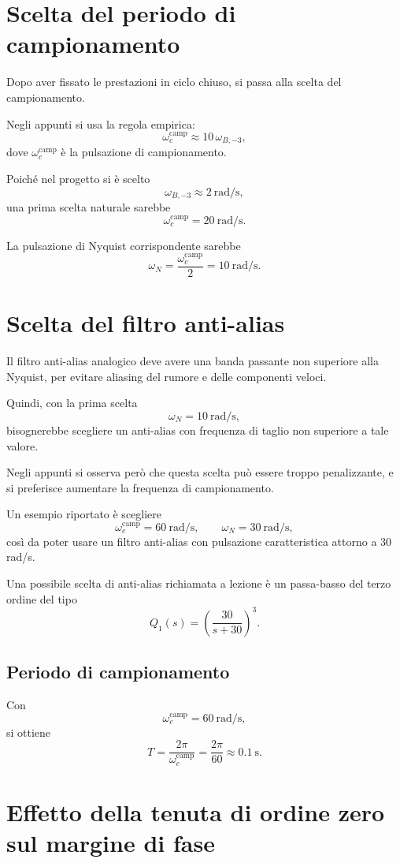 \section{Scelta del periodo di campionamento}

Dopo aver fissato le prestazioni in ciclo chiuso, si passa alla scelta del campionamento.

Negli appunti si usa la regola empirica:
\[
\omega_c^\text{camp} \approx 10\,\omega_{B,-3},
\]
dove \(\omega_c^\text{camp}\) \`e la pulsazione di campionamento.

Poich\'e nel progetto si \`e scelto
\[
\omega_{B,-3}\approx 2\ \text{rad/s},
\]
una prima scelta naturale sarebbe
\[
\omega_c^\text{camp}=20\ \text{rad/s}.
\]

La pulsazione di Nyquist corrispondente sarebbe
\[
\omega_N=\frac{\omega_c^\text{camp}}{2}=10\ \text{rad/s}.
\]

\section{Scelta del filtro anti-alias}

Il filtro anti-alias analogico deve avere una banda passante non superiore alla Nyquist,
per evitare aliasing del rumore e delle componenti veloci.

Quindi, con la prima scelta
\[
\omega_N=10\ \text{rad/s},
\]
bisognerebbe scegliere un anti-alias con frequenza di taglio non superiore a tale valore.

Negli appunti si osserva per\`o che questa scelta pu\`o essere troppo penalizzante,
e si preferisce aumentare la frequenza di campionamento.

Un esempio riportato \`e scegliere
\[
\omega_c^\text{camp}=60\ \text{rad/s},
\qquad
\omega_N=30\ \text{rad/s},
\]
cos\`i da poter usare un filtro anti-alias con pulsazione caratteristica attorno a \(30\) rad/s.

Una possibile scelta di anti-alias richiamata a lezione \`e un passa-basso del terzo ordine del tipo
\[
Q_1(s)=\left(\frac{30}{s+30}\right)^3.
\]

\subsection*{Periodo di campionamento}

Con
\[
\omega_c^\text{camp}=60\ \text{rad/s},
\]
si ottiene
\[
T=\frac{2\pi}{\omega_c^\text{camp}}=\frac{2\pi}{60}\approx 0.1\ \text{s}.
\]

\section{Effetto della tenuta di ordine zero sul margine di fase}

